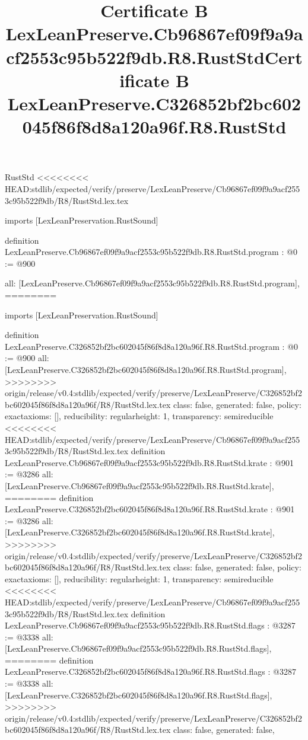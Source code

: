 \begin{lexlean}{RustStd}
<<<<<<<< HEAD:stdlib/expected/verify/preserve/LexLeanPreserve/Cb96867ef09f9a9acf2553c95b522f9db/R8/RustStd.lex.tex
\title{Certificate B LexLeanPreserve.Cb96867ef09f9a9acf2553c95b522f9db.R8.RustStd}
\begin{coremodule}
imports [LexLeanPreservation.RustSound]

definition LexLeanPreserve.Cb96867ef09f9a9acf2553c95b522f9db.R8.RustStd.program : @0 := @900 {
  all: [LexLeanPreserve.Cb96867ef09f9a9acf2553c95b522f9db.R8.RustStd.program],
========
\title{Certificate B LexLeanPreserve.C326852bf2bc602045f86f8d8a120a96f.R8.RustStd}
\begin{coremodule}
imports [LexLeanPreservation.RustSound]

definition LexLeanPreserve.C326852bf2bc602045f86f8d8a120a96f.R8.RustStd.program : @0 := @900 {
  all: [LexLeanPreserve.C326852bf2bc602045f86f8d8a120a96f.R8.RustStd.program],
>>>>>>>> origin/release/v0.4:stdlib/expected/verify/preserve/LexLeanPreserve/C326852bf2bc602045f86f8d8a120a96f/R8/RustStd.lex.tex
  class: false,
  generated: false,
  policy: exact{axioms: []},
  reducibility: regular{height: 1},
  transparency: semireducible
}
<<<<<<<< HEAD:stdlib/expected/verify/preserve/LexLeanPreserve/Cb96867ef09f9a9acf2553c95b522f9db/R8/RustStd.lex.tex
definition LexLeanPreserve.Cb96867ef09f9a9acf2553c95b522f9db.R8.RustStd.krate : @901 := @3286 {
  all: [LexLeanPreserve.Cb96867ef09f9a9acf2553c95b522f9db.R8.RustStd.krate],
========
definition LexLeanPreserve.C326852bf2bc602045f86f8d8a120a96f.R8.RustStd.krate : @901 := @3286 {
  all: [LexLeanPreserve.C326852bf2bc602045f86f8d8a120a96f.R8.RustStd.krate],
>>>>>>>> origin/release/v0.4:stdlib/expected/verify/preserve/LexLeanPreserve/C326852bf2bc602045f86f8d8a120a96f/R8/RustStd.lex.tex
  class: false,
  generated: false,
  policy: exact{axioms: []},
  reducibility: regular{height: 1},
  transparency: semireducible
}
<<<<<<<< HEAD:stdlib/expected/verify/preserve/LexLeanPreserve/Cb96867ef09f9a9acf2553c95b522f9db/R8/RustStd.lex.tex
definition LexLeanPreserve.Cb96867ef09f9a9acf2553c95b522f9db.R8.RustStd.flags : @3287 := @3338 {
  all: [LexLeanPreserve.Cb96867ef09f9a9acf2553c95b522f9db.R8.RustStd.flags],
========
definition LexLeanPreserve.C326852bf2bc602045f86f8d8a120a96f.R8.RustStd.flags : @3287 := @3338 {
  all: [LexLeanPreserve.C326852bf2bc602045f86f8d8a120a96f.R8.RustStd.flags],
>>>>>>>> origin/release/v0.4:stdlib/expected/verify/preserve/LexLeanPreserve/C326852bf2bc602045f86f8d8a120a96f/R8/RustStd.lex.tex
  class: false,
  generated: false,
}}}
\end{coremodule}}
\end{coremodule}
\end{lexlean}
